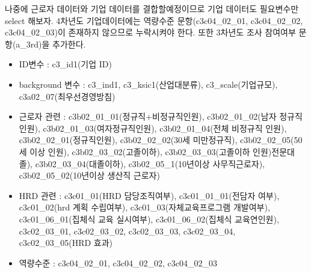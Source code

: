 \documentclass[
]{book}
\providecommand{\tightlist}{%
  \setlength{\itemsep}{0pt}\setlength{\parskip}{0pt}}
\begin{document}
나중에 근로자 데이터와 기업 데이터를 결합할예정이므로 기업 데이터도 필요변수만 select 해보자. 4차년도 기업데이터에는 역량수준 문항(c3c04\_02\_01, c3c04\_02\_02, c3c04\_02\_03)이 존재하지 않으므로 누락시켜야 한다. 또한 3차년도 조사 참여여부 문항(a\_3rd)을 추가한다.

\begin{itemize}
\tightlist
\item
  ID변수 : c3\_id1(기업 ID)
\item
  background 변수 : c3\_ind1, c3\_ksic1(산업대분류), c3\_scale(기업규모), c3a02\_07(최우선경영방침)
\item
  근로자 관련 : c3b02\_01\_01(정규직+비정규직인원), c3b02\_01\_02(남자 정규직인원), c3b02\_01\_03(여자정규직인원), c3b02\_01\_04(전체 비정규직 인원), c3b02\_02\_01(정규직인원), c3b02\_02\_02(30세 미만정규직), c3b02\_02\_05(50세 이상 인원), c3b02\_03\_02(고졸이하), c3b02\_03\_03(고졸이하 인원)전문대졸), c3b02\_03\_04(대졸이하), c3b02\_05\_1(10년이상 사무직근로자), c3b02\_05\_02(10년이상 생산직 근로자)
\item
  HRD 관련 : c3c01\_01(HRD 담당조직여부), c3c01\_01\_01(전담자 여부), c3c01\_02(hrd 계획 수립여부), c3c01\_03(자체교육프로그램 개발여부), c3c01\_06\_01(집체식 교육 실시여부), c3c01\_06\_02(집체식 교육연인원), c3c02\_03\_01, c3c02\_03\_02, c3c02\_03\_03, c3c02\_03\_04, c3c02\_03\_05(HRD 효과)
\item
  역량수준 : c3c04\_02\_01, c3c04\_02\_02, c3c04\_02\_03
\end{itemize}
\end{document}
